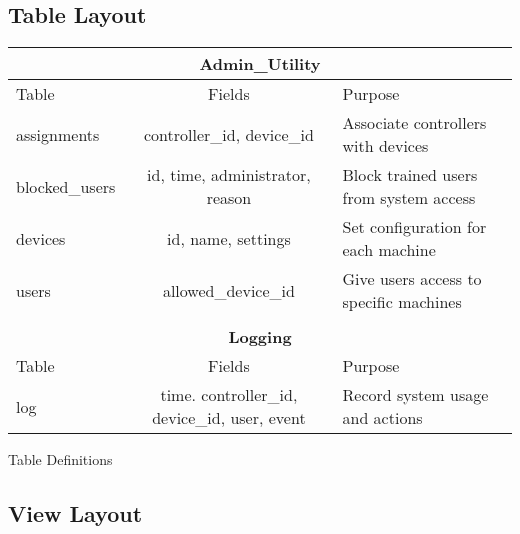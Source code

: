 \subsection{Table Layout}

\begin{databaseTable}
    \begin{tabular}{l c l}
        \multicolumn{3}{c}{\textbf{Admin\_Utility}} \\
        \toprule
        Table & Fields & Purpose \\
        \cmidrule(lr){1-3}
        assignments & controller\_id, device\_id & Associate controllers with devices \\
        blocked\_users & id, time, administrator, reason & Block trained users from system access \\
        devices & id, name, settings & Set configuration for each machine \\
        users & allowed\_device\_id & Give users access to specific machines \\
        \bottomrule \\
        \multicolumn{3}{c}{\textbf{Logging}} \\
        \toprule
        Table & Fields & Purpose \\
        \cmidrule(lr){1-3}
        log & time. controller\_id, device\_id, user, event & Record system usage and actions \\
        \bottomrule
    \end{tabular}
    \caption{Table Definitions}
    \label{table: table_defs}
\end{databaseTable}

\subsection{View Layout}

